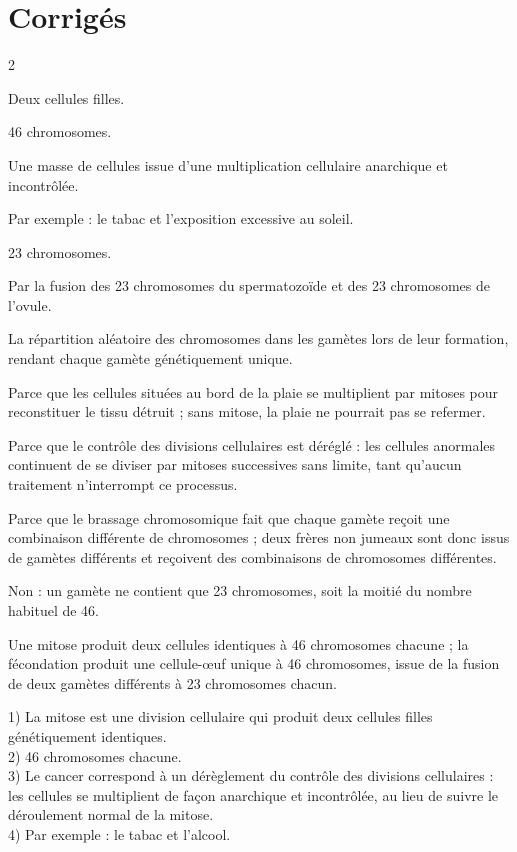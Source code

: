 \section{Corrigés}
\begin{multicols}{2}

Deux cellules filles.

46 chromosomes.

Une masse de cellules issue d'une multiplication cellulaire anarchique et
incontrôlée.

Par exemple : le tabac et l'exposition excessive au soleil.

23 chromosomes.

Par la fusion des 23 chromosomes du spermatozoïde et des 23 chromosomes de l'ovule.

La répartition aléatoire des chromosomes dans les gamètes lors de leur formation,
rendant chaque gamète génétiquement unique.

Parce que les cellules situées au bord de la plaie se multiplient par mitoses pour
reconstituer le tissu détruit ; sans mitose, la plaie ne pourrait pas se refermer.

Parce que le contrôle des divisions cellulaires est déréglé : les cellules anormales
continuent de se diviser par mitoses successives sans limite, tant qu'aucun traitement
n'interrompt ce processus.

Parce que le brassage chromosomique fait que chaque gamète reçoit une combinaison
différente de chromosomes ; deux frères non jumeaux sont donc issus de gamètes
différents et reçoivent des combinaisons de chromosomes différentes.

Non : un gamète ne contient que 23 chromosomes, soit la moitié du nombre habituel de
46.

Une mitose produit deux cellules identiques à 46 chromosomes chacune ; la fécondation
produit une cellule-œuf unique à 46 chromosomes, issue de la fusion de deux gamètes
différents à 23 chromosomes chacun.

1) La mitose est une division cellulaire qui produit deux cellules filles
génétiquement identiques.\\
2) 46 chromosomes chacune.\\
3) Le cancer correspond à un dérèglement du contrôle des divisions cellulaires : les
cellules se multiplient de façon anarchique et incontrôlée, au lieu de suivre le
déroulement normal de la mitose.\\
4) Par exemple : le tabac et l'alcool.


\end{multicols}
